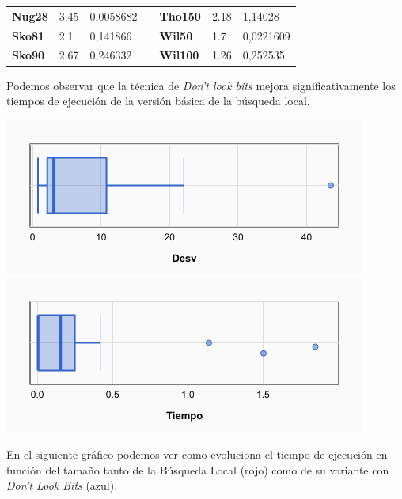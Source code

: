 \documentclass[a4paper, 12pt]{article}
\begin{document}
\begin{table}[H]
\begin{tabular}{|l|l|l|l|l|l|l|}
\textbf{Nug28}   & 3.45                               & 0,0058682                            &  & \textbf{Tho150}  & 2.18                               & 1,14028                              \\ \cline{1-3} \cline{5-7} 
\textbf{Sko81}   & 2.1                                & 0,141866                             &  & \textbf{Wil50}   & 1.7                                & 0,0221609                            \\ \cline{1-3} \cline{5-7} 
\textbf{Sko90}   & 2.67                               & 0,246332                             &  & \textbf{Wil100}  & 1.26                               & 0,252535                             \\ \cline{1-3} \cline{5-7} 
\end{tabular}
\end{table}

      Podemos observar que la técnica de \textit{Don't look bits} mejora significativamente los tiempos de ejecución de la versión básica de la búsqueda local.
      
      \vspace*{1cm}
      \begin{center}
         \includegraphics[scale=0.6]{boxplot-bldlb-desv}
         \includegraphics[scale=0.6]{boxplot-bldlb-time}
      \end{center}
      
      \newpage
         En el siguiente gráfico podemos ver como evoluciona el tiempo de ejecución en función del tamaño tanto de la Búsqueda Local (rojo) como de su variante con \textit{Don't Look Bits} (azul). \\
          
\end{document}
